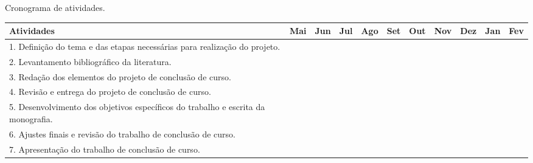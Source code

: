 \begin{quadro}[!htb]
    \centering
    \caption{Cronograma de atividades.\label{qua:quadro4}}
    \begin{tabular}{|p{4.5cm}|p{0.7cm}|p{0.7cm}|p{0.7cm}|p{0.7cm}|p{0.7cm}|p{0.7cm}|p{0.7cm}|p{0.7cm}|p{0.7cm}|p{0.7cm}|}
        \hline
        \textbf{Atividades} & \textbf{Mai} & \textbf{Jun} & \textbf{Jul} & \textbf{Ago} & \textbf{Set} & \textbf{Out} & \textbf{Nov} & \textbf{Dez} & \textbf{Jan} & \textbf{Fev} \\
        \hline
        \small{1. Definição do tema e das etapas necessárias para realização do projeto.} & \cellcolor[gray]{0.8}  &   &   &   &   &   &   &   &   &  \\
        \hline
        \small{2. Levantamento bibliográfico da literatura.} & \cellcolor[gray]{0.8} & \cellcolor[gray]{0.8} & \cellcolor[gray]{0.8}  &   &   &   &   &   &   &  \\
        \hline
	\small{3. Redação dos elementos do projeto de conclusão de curso.} &   &   & \cellcolor[gray]{0.8} & \cellcolor[gray]{0.8} &   &   &   &   &   &  \\
        \hline
	\small{4. Revisão e entrega do projeto de conclusão de curso.} &   &   &   & \cellcolor[gray]{0.8}  &  &   &   &   &   &  \\
        \hline
	\small{5. Desenvolvimento dos objetivos específicos do trabalho e escrita da monografia.} &   &   &   &   & \cellcolor[gray]{0.8}  & \cellcolor[gray]{0.8} & \cellcolor[gray]{0.8}  & \cellcolor[gray]{0.8} &  \cellcolor[gray]{0.8}  &  \\
        \hline
	\small{6. Ajustes finais e revisão do trabalho de conclusão de curso.} &   &   &   &   &   &   &   &  & \cellcolor[gray]{0.8} &  \\
        \hline
	\small{7. Apresentação do trabalho de conclusão de curso.} &   &   &   &   &   &   &   &   &  & \cellcolor[gray]{0.8} \\
        \hline
    \end{tabular}
\end{quadro}
